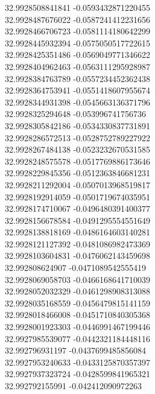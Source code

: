 {32.9928508841841	-0.0593432871220455\\
32.9928487676022	-0.0587241412231656\\
32.9928466706723	-0.0581114180642299\\
32.9928445932394	-0.0575050517722615\\
32.9928425351486	-0.0569049771346622\\
32.9928404962463	-0.0563111295928987\\
32.9928384763789	-0.0557234452362438\\
32.9928364753941	-0.0551418607955674\\
32.9928344931398	-0.0545663136371796\\
32.9928325294648	-0.053996741756736\\
32.9928305842186	-0.0534330837731891\\
32.9928286572513	-0.0528752789227922\\
32.9928267484138	-0.0523232670531585\\
32.9928248575578	-0.0517769886173646\\
32.9928229845356	-0.0512363846681231\\
32.9928211292004	-0.0507013968519817\\
32.9928192914059	-0.0501719674035951\\
32.9928174710067	-0.0496480391400377\\
32.9928156678584	-0.0491295554551649\\
32.9928138818169	-0.0486164603140281\\
32.9928121127392	-0.0481086982473369\\
32.9928103604831	-0.0476062143459698\\
32.992808624907	-0.0471089542555419\\
32.9928069058703	-0.0466168641710039\\
32.9928052032329	-0.0461298908313088\\
32.9928035168559	-0.0456479815141159\\
32.9928018466008	-0.0451710840305368\\
32.9928001923303	-0.0446991467199446\\
32.9927985539077	-0.0442321184448116\\
32.992796931197	-0.0437699485856084\\
32.9927953240633	-0.0433125870357397\\
32.9927937323724	-0.0428599841965321\\
32.992792155991	-0.042412090972263\\
}
